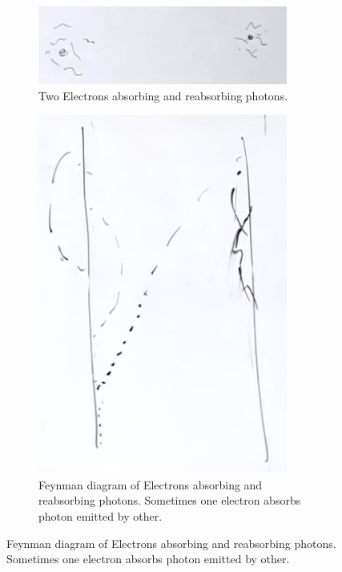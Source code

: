 \documentclass[]{article}
\begin{document}
\begin{figure}[H]
	\caption{Two Electrons }
	\begin{subfigure}[t]{0.45\textwidth}
		\caption{Two Electrons absorbing and reabsorbing photons.}\label{fig:2-1-second-electron-photons}
		\includegraphics[width=0.9\textwidth]{2-1-second-electron-photons}
	\end{subfigure}
	\begin{subfigure}[t]{0.45\textwidth}
		\caption{Feynman diagram of Electrons absorbing and reabsorbing photons. Sometimes one electron absorbs photon emitted by other.}\label{fig:2-1-electron-photons-feynmann}
		\includegraphics[width=0.9\textwidth]{2-1-second-electron-photons-feynman}
	\end{subfigure}
\end{figure}
\end{document}
